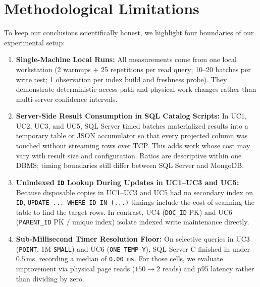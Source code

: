 \section{Methodological Limitations}
To keep our conclusions scientifically honest, we highlight four boundaries of our experimental setup:
\begin{enumerate}
\item \textbf{Single-Machine Local Runs:} All measurements come from one local workstation (2 warmups + 25 repetitions per read query; 10--20 batches per write test; 1 observation per index build and freshness probe). They demonstrate deterministic access-path and physical work changes rather than multi-server confidence intervals.
\item \textbf{Server-Side Result Consumption in SQL Catalog Scripts:} In UC1, UC2, UC3, and UC5, SQL Server timed batches materialized results into a temporary table or JSON accumulator so that every projected column was touched without streaming rows over TCP. This adds work whose cost may vary with result size and configuration. Ratios are descriptive within one DBMS; timing boundaries still differ between SQL Server and MongoDB.
\item \textbf{Unindexed \texttt{ID} Lookup During Updates in UC1--UC3 and UC5:} Because disposable copies in UC1--UC3 and UC5 had no secondary index on \texttt{ID}, \texttt{UPDATE ... WHERE ID IN (...)} timings include the cost of scanning the table to find the target rows. In contrast, UC4 (\texttt{DOC\_ID} PK) and UC6 (\texttt{PARENT\_ID} PK / unique index) isolate indexed write maintenance directly.
\item \textbf{Sub-Millisecond Timer Resolution Floor:} On selective queries in UC3 (\texttt{POINT}, 1M \texttt{SMALL}) and UC6 (\texttt{ONE\_TEMP\_Y}), SQL Server C finished in under $0.5$\,ms, recording a median of \texttt{0.00\,ms}. For those cells, we evaluate improvement via physical page reads ($150 \rightarrow 2$ reads) and p95 latency rather than dividing by zero.
\end{enumerate}
\FloatBarrier
